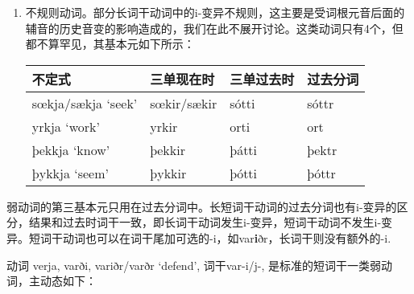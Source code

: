 \begin{enumerate}
    \item
          不规则动词。部分长词干动词中的i-变异不规则，这主要是受词根元音后面的辅音的历史音变的影响造成的，我们在此不展开讨论。这类动词只有4个，但都不算罕见，其基本元如下所示：

          \begin{longtable}{llll}
              \toprule
              不定式                & 三单现在时       & 三单过去时 & 过去分词  \\
              \midrule
              \endhead
              \bottomrule
              \endfoot
              sœkja/sækja `seek' & sœkir/sækir & sótti & sóttr \\
              yrkja `work'       & yrkir       & orti  & ort   \\
              þekkja `know'      & þekkir      & þátti & þektr \\
              þykkja `seem'      & þykkir      & þótti & þóttr \\
          \end{longtable}
\end{enumerate}

弱动词的第三基本元只用在过去分词中。长短词干动词的过去分词也有i-变异的区分，结果和过去时词干一致，即长词干动词发生i-变异，短词干动词不发生i-变异。短词干动词也可以在词干尾加可选的-i，如var\textbf{i}ðr，长词干则没有额外的-i.

动词 verja, varði, variðr/varðr `defend‌', 词干var-i/j-, 是标准的短词干一类弱动词，主动态如下：


